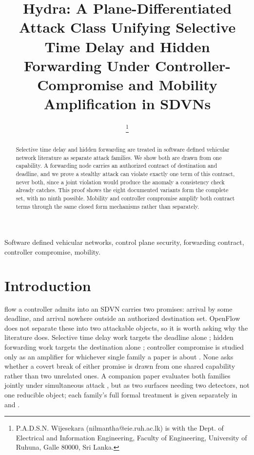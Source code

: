 \documentclass[lettersize,journal]{IEEEtran}
\begin{document}
	\title{Hydra: A Plane-Differentiated Attack Class Unifying Selective Time Delay and Hidden Forwarding Under Controller-Compromise and Mobility Amplification in SDVNs}
	\author{
		\thanks{P.A.D.S.N. Wijesekara (nilmantha@eie.ruh.ac.lk) is with the Dept. of Electrical and Information Engineering, Faculty of Engineering, University of Ruhuna, Galle 80000, Sri Lanka.}
	}

	\maketitle

	\begin{abstract}
	Selective time delay and hidden forwarding are treated in software defined vehicular network literature as separate attack families. We show both are drawn from one capability. A forwarding node carries an authorized contract of destination and deadline, and we prove a stealthy attack can violate exactly one term of this contract, never both, since a joint violation would produce the anomaly a consistency check already catches. This proof shows the eight documented variants form the complete set, with no ninth possible. Mobility and controller compromise amplify both contract terms through the same closed form mechanisms rather than separately.
	\end{abstract}

	\begin{IEEEkeywords}
		Software defined vehicular networks, control plane security, forwarding contract, controller compromise, mobility.
	\end{IEEEkeywords}

\section{Introduction}
 flow a controller admits into an SDVN carries two promises: arrival by some deadline, and arrival nowhere outside an authorized destination set. OpenFlow does not separate these into two attackable objects, so it is worth asking why the literature does. Selective time delay work targets the deadline alone \cite{pascoal2017tap,sfto2023}; hidden forwarding work targets the destination alone \cite{fade2016,sdnsec2016}; controller compromise is studied only as an amplifier for whichever single family a paper is about \cite{wang2020topology}. None asks whether a covert break of either promise is drawn from one shared capability rather than two unrelated ones. A companion paper evaluates both families jointly under simultaneous attack \cite{nexus2026}, but as two surfaces needing two detectors, not one reducible object; each family's full formal treatment is given separately in \cite{phantom2026} and \cite{vanguardhf2026}.
\end{document}
